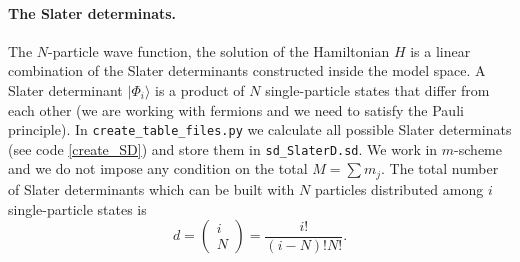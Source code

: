 \documentclass[twoside]{article}
\newcommand{\ket}[1]{| #1 \rangle}
\begin{document}
\paragraph{The Slater determinats.} The $N$-particle wave function, the solution of the Hamiltonian $H$ is a linear combination of the Slater determinants constructed inside the model space. A Slater determinant $\ket{\Phi_i}$ is a product of $N$ single-particle states that differ from each other (we are working with fermions and we need to satisfy the Pauli principle). In \texttt{create\_table\_files.py} we calculate all possible Slater determinats (see code \ref{create_SD}) and store them in \texttt{sd\_SlaterD.sd}. We work in $m$-scheme and we do not impose any condition on the total $M= \sum m_j$.
The total number of Slater determinants which can be built with $N$ particles distributed among $i$ single-particle states is
\begin{equation}\label{binSD}
d=\left (\begin{array}{c} i \\ N\end{array} \right) =\frac{i!}{(i-N)!N!}. 
\end{equation}
\end{document}

